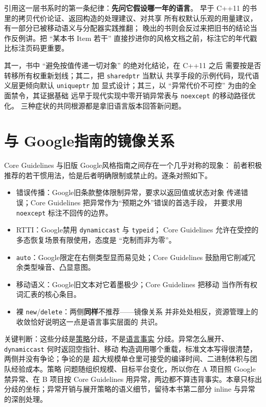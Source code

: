 \documentclass[12pt,a4paper,fontset=fandol]{ctexbook}
\newcommand{\cpp}[1]{C++#1}
\newcommand{\Tp}[1]{\texttt{#1}}
\newcommand{\Bk}{\discretionary{}{}{}}
\newcommand{\Lang}[1]{\textsf{#1}}
\newcommand{\DomGo}{\Lang{Google}}
\begin{document}
引用这一层书系时的第一条纪律：\textbf{先问它假设哪一年的语言}。
早于 \cpp{11} 的书里的拷贝代价论证、返回构造的处理建议、对共享
所有权默认乐观的用量建议，有一部分已被移动语义与分配器实践推翻；
晚出的书则会反过来把旧书的结论当作反例讲。把 ``某本书 Item
若干'' 直接抄进你的风格文档之前，标注它的年代戳比标注页码更重要。

\begin{warning}[title={过时年代戳的三种典型症状}]
其一，书中 ``避免按值传递一切对象'' 的绝对化结论，在 \cpp{11} 之后
需要按是否转移所有权重新划线；其二，把 \Tp{shared{\Bk}ptr} 当默认
共享手段的示例代码，现代语义层更倾向默认 \Tp{unique{\Bk}ptr} 加
显式设计；其三，以 ``异常代价不可控'' 为由的全面禁令，其证据基础
远早于现代实现中零开销异常表与 \Tp{noexcept} 的移动路径优化。
三种症状的共同根源都是拿旧语言版本回答新问题。
\end{warning}

\section{与 \DomGo 指南的镜像关系}
\label{sec:ch05-mirror}

Core Guidelines 与旧版 \DomGo 风格指南之间存在一个几乎对称的现象：
前者积极推荐的若干惯用法，恰是后者明确限制或禁止的。逐条对照如下。

\begin{compare}[title={同一主题、两侧说法：\DomGo 旧条款与 Core Guidelines}]
\begin{itemize}
\item 错误传播：\DomGo 旧条款整体限制异常，要求以返回值或状态对象
  传递错误；Core Guidelines 把异常作为``预期之外''错误的首选手段，
  并要求用 \Tp{noexcept} 标注不回传的边界。
\item RTTI：\DomGo 禁用 \Tp{dynamic{\Bk}cast} 与 \Tp{typeid}；
  Core Guidelines 允许在受控的多态恢复场景有限使用，态度是
  ``克制而非为零''。
\item \Tp{auto}：\DomGo 限定在右侧类型显而易见处；Core Guidelines
  鼓励用它削减冗余类型噪音、凸显意图。
\item 移动语义：\DomGo 旧文本对它着墨极少；Core Guidelines 把移动
  当作所有权词汇表的核心条目。
\item 裸 \Tp{new}/{\Bk}\Tp{delete}：两侧\textbf{同样}不推荐——镜像关系
  并非处处相反，资源管理上的收敛恰好说明这一点是语言事实层面的
  共识。
\end{itemize}
\end{compare}

关键判断：这些分歧是\underline{策略}分歧，不是\underline{语言事实}
分歧。异常怎么展开、\Tp{dynamic{\Bk}cast} 何时返回空指针、移动
构造调用哪个重载，标准文本写得很清楚，两侧并没有争论；争论的是
超大规模单仓里可接受的编译时间、二进制体积与团队经验成本。策略
问题随组织规模、目标平台变化，所以你在 A 项目照 \DomGo 禁异常、在
B 项目按 Core Guidelines 用异常，两边都不算违背事实。本章只标出
分歧的坐标；异常开销与展开策略的语义细节，留待本书第二部分
inline 与异常的深剖处理。
\end{document}
